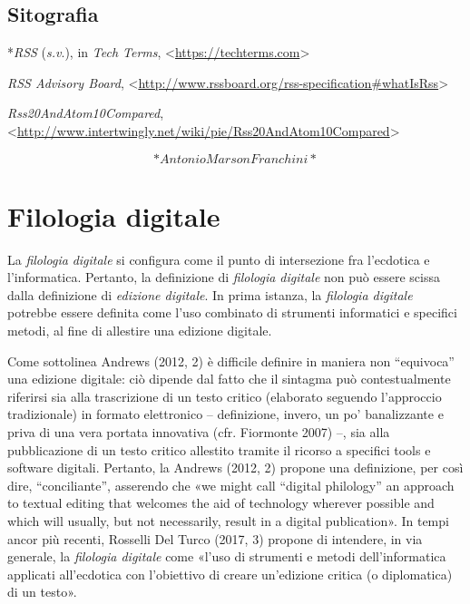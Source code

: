 \documentclass[
  b5paper,
  twoside,
  11pt,
  chapterprefix=false,
  bibliography=totocnumbered,
  listof=flat]{scrbook}
\begin{document}
\hypertarget{sitografia-11}{%
\section*{Sitografia}\label{sitografia-11}}

*\emph{RSS} (\emph{s.v}.), in \emph{Tech Terms},
\textless{}{\href{https://techterms.com/}{https://techterms.com}\textgreater{}}

\emph{RSS Advisory Board},
\textless{}{\url{http://www.rssboard.org/rss-specification\#whatIsRss}\textgreater{}}

\emph{Rss20AndAtom10Compared},
\textless{}{\url{http://www.intertwingly.net/wiki/pie/Rss20AndAtom10Compared}\textgreater{}}

\[*Antonio Marson Franchini*\]

\hypertarget{filologia-digitale}{%
\chapter{Filologia digitale}\label{filologia-digitale}}

La \emph{filologia} \emph{digitale} si configura come il punto di intersezione fra
l'ecdotica e l'informatica. Pertanto, la definizione di \emph{filologia
digitale} non può essere scissa dalla definizione di \emph{edizione
digitale}. In prima istanza, la \emph{filologia digitale} potrebbe essere
definita come l'uso combinato di strumenti informatici e specifici
metodi, al fine di allestire una edizione digitale.

Come sottolinea Andrews (2012, 2) è difficile definire in maniera non
\enquote{equivoca} una edizione digitale: ciò dipende dal fatto che il sintagma
può contestualmente riferirsi sia alla trascrizione di un testo critico
(elaborato seguendo l'approccio tradizionale) in formato elettronico --
definizione, invero, un po' banalizzante e priva di una vera portata
innovativa (cfr. Fiormonte 2007) --, sia alla pubblicazione di un testo
critico allestito tramite il ricorso a specifici tools e software
digitali. Pertanto, la Andrews (2012, 2) propone una definizione, per
così dire, \enquote{conciliante}, asserendo che «we might call \enquote{digital
philology} an approach to textual editing that welcomes the aid of
technology wherever possible and which will usually, but not
necessarily, result in a digital publication». In tempi ancor più
recenti, Rosselli Del Turco (2017, 3) propone di intendere, in via
generale, la \emph{filologia digitale} come «l'uso di strumenti e metodi
dell'informatica applicati all'ecdotica con l'obiettivo di creare
un'edizione critica (o diplomatica) di un testo».
\end{document}
